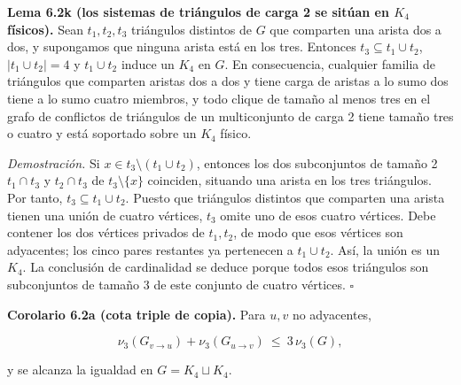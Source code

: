 \documentclass[spanish,11pt,a4paper]{article}
\begin{document}
\textbf{Lema 6.2k (los sistemas de triángulos de carga 2 se sitúan en
\(K_4\) físicos).} Sean \(t_1,t_2,t_3\) triángulos distintos de \(G\)
que comparten una arista dos a dos, y supongamos que ninguna arista está
en los tres. Entonces \(t_3\subseteq t_1\cup t_2\), \(|t_1\cup t_2|=4\)
y \(t_1\cup t_2\) induce un \(K_4\) en \(G\). En consecuencia, cualquier
familia de triángulos que comparten aristas dos a dos y tiene carga de
aristas a lo sumo dos tiene a lo sumo cuatro miembros, y todo clique de
tamaño al menos tres en el grafo de conflictos de triángulos de un
multiconjunto de carga 2 tiene tamaño tres o cuatro y está soportado
sobre un \(K_4\) físico.

\emph{Demostración.} Si \(x\in t_3\setminus(t_1\cup t_2)\), entonces los
dos subconjuntos de tamaño 2 \(t_1\cap t_3\) y \(t_2\cap t_3\) de
\(t_3\setminus\{x\}\) coinciden, situando una arista en los tres
triángulos. Por tanto, \(t_3\subseteq t_1\cup t_2\). Puesto que
triángulos distintos que comparten una arista tienen una unión de cuatro
vértices, \(t_3\) omite uno de esos cuatro vértices. Debe contener los
dos vértices privados de \(t_1,t_2\), de modo que esos vértices son
adyacentes; los cinco pares restantes ya pertenecen a \(t_1\cup t_2\).
Así, la unión es un \(K_4\). La conclusión de cardinalidad se deduce
porque todos esos triángulos son subconjuntos de tamaño 3 de este
conjunto de cuatro vértices. \(\square\)

\textbf{Corolario 6.2a (cota triple de copia).} Para \(u,v\) no
adyacentes,

\[
\nu_3(G_{v\to u})+\nu_3(G_{u\to v})\ \le\ 3\,\nu_3(G),
\]

y se alcanza la igualdad en \(G=K_4\sqcup K_4\).
\end{document}
